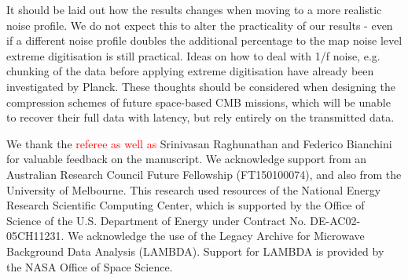 \documentclass[apj]{emulateapj}
\newcommand{\changed}[1]{\textcolor{Red}{#1}}
\begin{document}
It should be laid out how the results changes when moving to a more realistic noise profile. We do not expect this to alter the practicality of our results - even if a different noise profile doubles the additional percentage to the map noise level extreme digitisation is still practical. Ideas on how to deal with 1/f noise, e.g. chunking of the data before applying extreme digitisation have already been investigated by Planck. These thoughts should be considered when designing the compression schemes of future space-based CMB missions, which will be unable to recover their full data with latency, but rely entirely on the transmitted data.


\acknowledgments %

We thank the \changed{referee as well as} Srinivasan Raghunathan and Federico Bianchini for valuable feedback on the manuscript. 
We acknowledge support from an Australian Research Council Future Fellowship (FT150100074), and also from the University of Melbourne. 
This research used resources of the National Energy Research Scientific Computing Center, which is supported by the Office of Science of the U.S. Department of Energy under Contract No. DE-AC02-05CH11231. 
We acknowledge the use of the Legacy Archive for Microwave Background Data Analysis (LAMBDA). Support for LAMBDA is provided by the NASA Office of Space Science.


%
\end{document}
